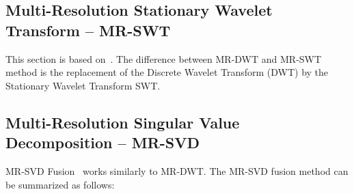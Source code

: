 \documentclass[journal]{IEEEtran}
\begin{document}
\subsection{Multi-Resolution Stationary Wavelet Transform -- MR-SWT}  
This section is based on~\cite{n_r, jjly}. The difference between MR-DWT and MR-SWT method is the replacement of the 
Discrete Wavelet Transform (DWT) by the
Stationary Wavelet Transform SWT. 

\subsection{Multi-Resolution Singular Value Decomposition -- MR-SVD}

MR-SVD Fusion~\cite{naidu} works similarly to MR-DWT. 
The MR-SVD fusion method can be summarized as follows:
\end{document}
